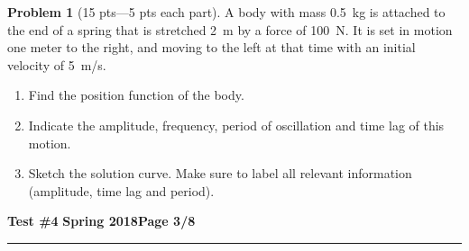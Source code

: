 \documentclass[12pt]{article}
\theoremstyle{definition}
\newtheorem{problem}{Problem}
\begin{document}
\bigskip
\begin{problem}[15 pts---5 pts each part]
A body with mass 0.5~kg is attached to the end of a spring that is stretched 2~m by a force of 100~N.  It is set in motion one meter to the right, and moving to the left at that time with an initial velocity of 5~m/s.
\begin{enumerate}
  \item Find the position function of the body.
  \vspace{4cm}
  \begin{flushright}
  \end{flushright}
  \item Indicate the amplitude, frequency, period of oscillation and time lag of this motion.
  \vspace{4cm}
  \begin{flushright}
  \end{flushright}
  \item Sketch the solution curve.  Make sure to label all relevant information (amplitude, time lag and period).
\end{enumerate}
\end{problem} 

\newpage

\hfill{\large\bf Test \#4}\hfill{\large\bf
  Spring 2018}\hfill{\large\bf Page 3/8}\hrule
\end{document}
